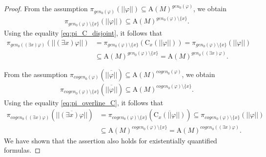 \documentclass[10pt,a4paper]{amsart}
\def\A{\textrm{A}}
\def\C{\textrm{C}}
\def\cogen{cogen}
\def\cogenz{\cogen_0}
\def\gen{gen}
\def\genz{\gen_0}
\begin{document}
\begin{proof}
From the assumption $\pi_{\genz(\varphi)}(||\varphi||)\subseteq \A(M)^{\genz(\varphi)}$, we obtain
\begin{align*}
\pi_{\genz(\varphi)\setminus\{x\}}(||\varphi||)\subseteq \A(M)^{\genz(\varphi)\setminus\{x\}}. 
\end{align*}
Using the equality \eqref{eq:pi_C_disjoint}, it follows that
\begin{align*}
\pi_{\genz((\exists x)\varphi)}(||(\exists x)\varphi||)&=\pi_{\genz(\varphi)\setminus\{x\}}(\C_x(||\varphi||))=\pi_{\genz(\varphi)\setminus\{x\}}(||\varphi||)\\
&\subseteq\A(M)^{\genz(\varphi)\setminus\{x\}}=\A(M)^{\genz((\exists x)\varphi)}.
\end{align*}

From the assumption $\pi_{\cogenz(\varphi)}(\overline{||\varphi||})\subseteq \A(M)^{\cogenz(\varphi)}$, we obtain
\begin{align*}
\pi_{\cogenz(\varphi)\setminus\{x\}}(\overline{||\varphi||})\subseteq \A(M)^{\cogenz(\varphi)\setminus\{x\}}. 
\end{align*}
Using the equality \eqref{eq:pi_overline_C}, it follows that
\begin{align*}
\pi_{\cogenz((\exists x)\varphi)}(\overline{||(\exists x)\varphi||})&=\pi_{\cogenz(\varphi)\setminus\{x\}}(\overline{\C_x(||\varphi||)})\subseteq\pi_{\cogenz(\varphi)\setminus\{x\}}(||\varphi||)\\
&\subseteq\A(M)^{\cogenz(\varphi)\setminus\{x\}}=\A(M)^{\cogenz((\exists x)\varphi)}.
\end{align*}
We have shown that the assertion also holds for existentially quantified formulas.
\end{proof}
\end{document}
